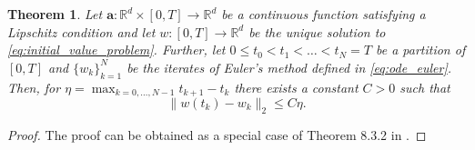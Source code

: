 \documentclass[12pt]{article}
\newtheorem{theorem}{Theorem}[section]
\theoremstyle{definition}
\numberwithin{equation}{section}
\newcommand{\R}{\mathbb{R}}
\newcommand{\norm}[1]{\lVert{#1}\rVert_2}
\begin{document}
\begin{theorem}
  \label{thm:euler_convergence}
  Let $\mathbf{a} : \R^d \times [0,T] \rightarrow \R^d$ be a continuous function satisfying a Lipschitz condition and let $w:[0,T] \rightarrow \R^d$ be the unique solution to \eqref{eq:initial_value_problem}. Further, let $0 \leq t_0 < t_1 < \dots < t_N = T$ be a partition of $[0,T]$ and $\{w_k\}_{k=1}^N$ be the iterates of Euler's method defined in \eqref{eq:ode_euler}. Then, for $\eta = \max_{k=0,\dots,N-1} t_{k+1} - t_k$ there exists a constant $C > 0$ such that
  \begin{equation*}
    \norm{w(t_k) - w_k} \leq C \eta.
  \end{equation*}
\end{theorem}
\begin{proof}
  The proof can be obtained as a special case of Theorem 8.3.2 in \cite[pp.~294]{kloedenNumericalSolutionStochastic2013}.
\end{proof}
\end{document}
